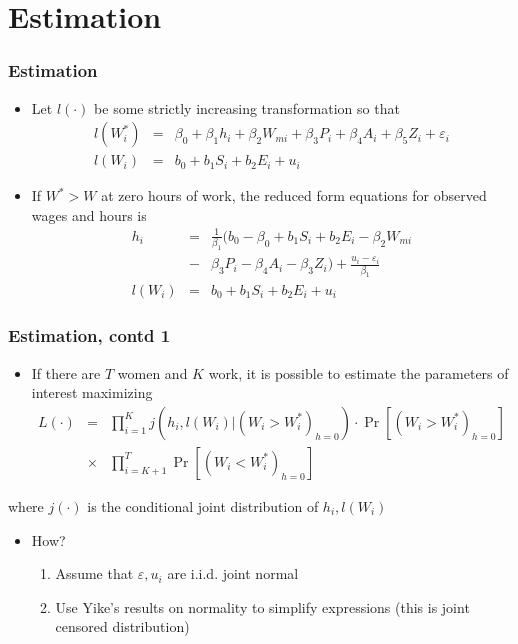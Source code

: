 \section{Estimation}
	\begin{frame}
		\frametitle{Estimation}
			\begin{itemize}
				\item Let $l(\cdot)$ be some strictly increasing transformation so that
					\begin{eqnarray}
						l(W_{i}^*) &=& \beta_{0} + \beta_{1}h_{i} + \beta_{2} W_{mi} + \beta_{3} P_{i} + \beta_{4} A_{i} + \beta_{5} Z_{i} + \varepsilon_{i} \nonumber \\
						l(W_{i}) &=& b_{0} + b_{1} S_{i} + b_{2} E_{i} + u_{i} 
					\end{eqnarray}
				\item If $W^* > W$ at zero hours of work, the reduced form equations for observed wages and hours is
				\begin{eqnarray}
				h_{i} &=& \frac{1}{\beta_{1}} ( b_{0} - \beta_{0} + b_{1} S_{i} + b_{2} E_{i} - \beta_{2} W_{mi} \nonumber \\
				&-& \beta_{3} P_{i} - \beta_{4} A_{i} - \beta_{3} Z_{i} ) + \frac{u_{i} - \varepsilon_{i}}{\beta_{1}} \nonumber \\
				l(W_{i}) &=& b_{0} + b_{1} S_{i} + b_{2} E_{i} + u_{i} 
				\end{eqnarray}
			\end{itemize}
	\end{frame}

\begin{frame}
	\frametitle{Estimation, contd 1}
		\begin{itemize}
			\item If there are $T$ women and $K$ work, it is possible to estimate the parameters of interest maximizing
			\begin{eqnarray}
				L(\cdot) &=& \prod _{i=1} ^{K} j \left( h_{i}, l(W_{i}) | (W_{i} > W_{i}^* )_{h = 0}\right) \cdot \Pr \left[ (W_{i} > W_{i}^* )_{h = 0} \right] \nonumber \\ 
				&\times& \prod _{i=K+1} ^{T} \Pr \left[ (W_{i} < W_{i}^* )_{h = 0} \right]
			\end{eqnarray}
		\end{itemize}
\noindent where $j(\cdot)$ is the conditional joint distribution of $h_{i}, l(W_{i})$
	\begin{itemize}
		\item How?
			\begin{enumerate}
				\item Assume that $\varepsilon, u_{i}$ are i.i.d. joint normal
				\item Use Yike's results on normality to simplify expressions (this is joint censored distribution)
			\end{enumerate}
	\end{itemize}
\end{frame}


